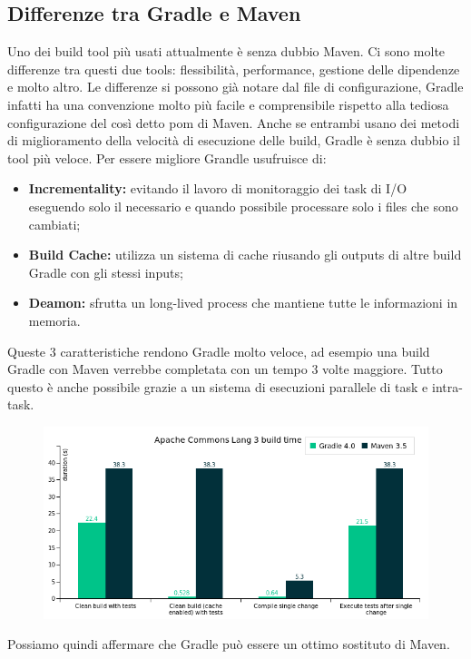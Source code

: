 \subsection{Differenze tra Gradle e Maven}
Uno dei build tool più usati attualmente è senza dubbio Maven. Ci sono molte differenze tra questi due tools: flessibilità, performance, gestione delle dipendenze e molto altro. Le differenze si possono già notare dal file di configurazione, Gradle infatti ha una convenzione molto più facile e comprensibile rispetto alla tediosa configurazione del così detto pom di Maven. Anche se entrambi usano dei metodi di miglioramento della velocità di esecuzione delle build, Gradle è senza dubbio il tool più veloce. Per essere migliore Grandle usufruisce di:
\begin{itemize}
    \item \textbf{Incrementality:} evitando il lavoro di monitoraggio dei task di I/O eseguendo solo il necessario e quando possibile processare solo i files che sono cambiati;
    \item \textbf{Build Cache:} utilizza un sistema di cache riusando gli outputs di altre build Gradle con gli stessi inputs;
    \item \textbf{Deamon:} sfrutta un long-lived process che mantiene tutte le informazioni in memoria.
\end{itemize}
Queste 3 caratteristiche rendono Gradle molto veloce, ad esempio una build Gradle con Maven verrebbe completata con un tempo 3 volte maggiore. Tutto questo è anche possibile grazie a un sistema di esecuzioni parallele di task e intra-task.
\begin{figure}[H]
\centering
\includegraphics[width=0.7\linewidth]{0introduction/gradle/performance.png}
\end{figure}
Possiamo quindi affermare che Gradle può essere un ottimo sostituto di Maven.
